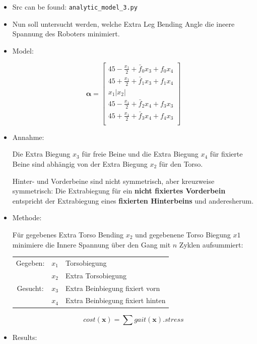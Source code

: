 \documentclass[10pt,a4paper]{article}
\begin{document}
\begin{itemize}

\item Src can be found: \texttt{analytic\_model\_3.py}


\item Nun soll untersucht werden, welche Extra Leg Bending Angle die ineere Spannung des Roboters minimiert.

\item Model:

\begin{equation}
\bm{\alpha} = \begin{bmatrix}
45 - \frac{x_1}{2} + \bar{f}_0x_3 + f_0x_4 \\
45 + \frac{x_1}{2} + \bar{f}_1x_3 + f_1x_4 \\
x_1|x_2| \\
45 - \frac{x_1}{2} + \bar{f}_2x_4 + f_3x_3 \\
45 + \frac{x_1}{2} + \bar{f}_3x_4 + f_4x_3 \\
\end{bmatrix}
\end{equation}


\item Annahme:

Die Extra Biegung $x_3$ für freie Beine und die Extra Biegung $x_4$ für fixierte Beine sind abhängig von der Extra Biegung $x_2$ für den Torso.

Hinter- und Vorderbeine sind nicht symmetrisch, aber kreuzweise symmetrisch:
Die Extrabiegung für ein \textbf{nicht fixiertes Vorderbein} entspricht der Extrabiegung eines \textbf{fixierten Hinterbeins} und anderesherum.


\item Methode:

Für gegebenes Extra Torso Bending $x_2$ und gegebenene Torso Biegung $x1$ minimiere die Innere Spannung über den Gang mit $n$ Zyklen aufsummiert:

\begin{tabular}{c c l}
Gegeben: 	& $x_1$ & Torsobiegung \\
			& $x_2$	& Extra Torsobiegung \\
Gesucht:	& $x_3$	& Extra Beinbiegung fixiert vorn \\
			& $x_4$	& Extra Beinbiegung fixiert hinten \\
\end{tabular}


\begin{equation}
cost(\bm{x}) = \sum gait(\bm{x}).stress
\end{equation}



\item Results:
\end{itemize}
\end{document}
